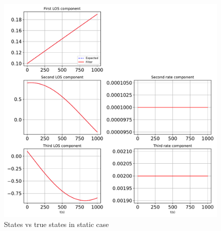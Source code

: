 \begin{figure}[htbp]\centerline{\includegraphics[height=0.9\textwidth, keepaspectratio]{AutoTeX/StatesExpected}}\caption{States vs true states in static case}\label{fig:StatesExpected}\end{figure}